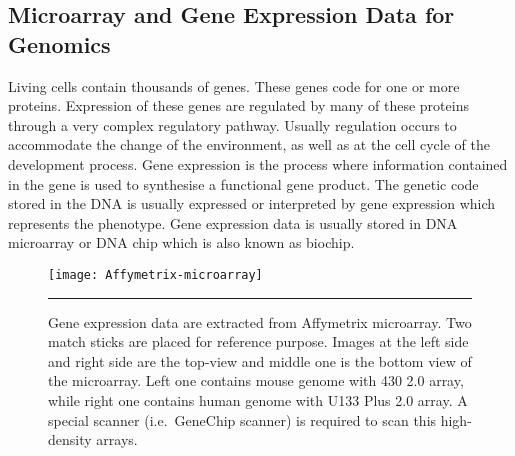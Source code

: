 \subsection{Microarray and Gene Expression Data for Genomics }
Living cells contain thousands of genes. These genes code for one or more proteins. Expression of these genes are regulated by many of these proteins through a very complex regulatory pathway. Usually regulation occurs to accommodate the change of the environment, as well as at the cell cycle of the development process. %
Gene expression is the process where information contained in the gene is used to synthesise a functional gene product. The genetic code stored in the DNA is usually expressed or interpreted by gene expression which represents the  phenotype. Gene expression data is usually stored in DNA microarray or DNA chip which is also known as biochip. 

\begin{figure}[t]
	\centering
	\texttt{[image: Affymetrix-microarray]}
		\rule{35em}{0.5pt}
	\caption[Affymetrix Microarray]{Gene expression data are extracted from Affymetrix microarray. Two match sticks are placed for reference purpose. Images at the left side and right side are the top-view and middle one is the bottom view of the microarray. Left one contains mouse genome with 430 2.0 array, while right one contains human genome with U133 Plus 2.0 array. A special scanner (i.e.\ GeneChip scanner) is required to scan this high-density arrays.}
	\label{fig:Affymetrix-microarray}
\end{figure}
 
